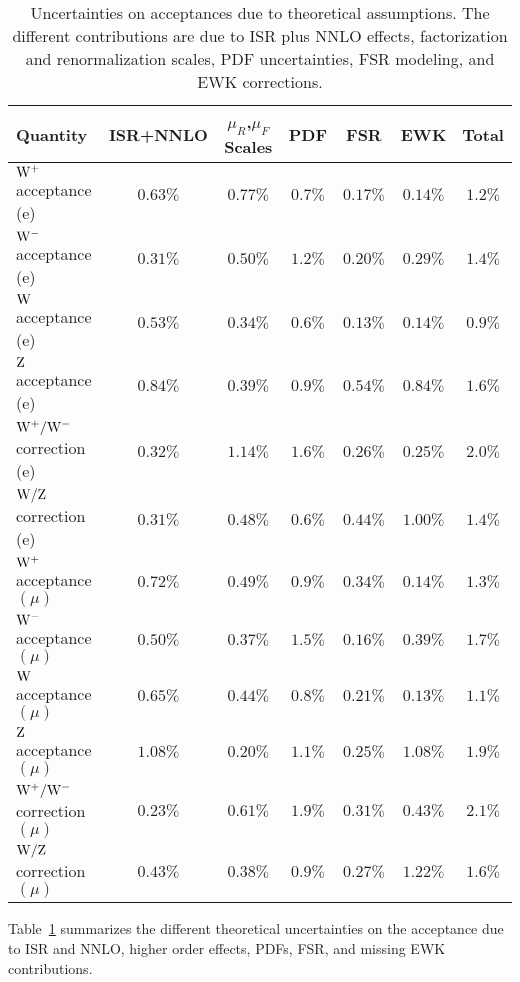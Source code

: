 \begin{table}[!ht] %
\begin{center}
\caption{Uncertainties on acceptances due to theoretical assumptions. The different contributions are due to
ISR plus NNLO effects, factorization and renormalization scales, PDF uncertainties, FSR modeling, and EWK corrections.}
\label{tab:th_results}
\begin{tabular}{|l|ccccc|c|}
	\hline
	Quantity & ISR+NNLO & $\mu_R$,$\mu_F$ Scales & PDF & FSR & EWK & Total \\
	\hline\hline
	$\mathrm{W^+}$ acceptance (e)     & $0.63\%$ & $0.77\%$ & $0.7\%$ & $0.17\%$ & $0.14\%$ & $1.2\%$ \\
	$\mathrm{W^-}$ acceptance (e)     & $0.31\%$ & $0.50\%$ & $1.2\%$ & $0.20\%$ & $0.29\%$ & $1.4\%$ \\
	$\mathrm{W}$ acceptance (e)       & $0.53\%$ & $0.34\%$ & $0.6\%$ & $0.13\%$ & $0.14\%$ & $0.9\%$ \\
	$\mathrm{Z}$ acceptance (e)       & $0.84\%$ & $0.39\%$ & $0.9\%$ & $0.54\%$ & $0.84\%$ & $1.6\%$ \\
	$\mathrm{W^+}/\mathrm{W^-}$ correction (e) & $0.32\%$ & $1.14\%$ & $1.6\%$ & $0.26\%$ & $0.25\%$ & $2.0\%$ \\
	$\mathrm{W}/\mathrm{Z}$ correction (e)     & $0.31\%$ & $0.48\%$ & $0.6\%$ & $0.44\%$ & $1.00\%$ & $1.4\%$ \\
	\hline
	$\mathrm{W^+}$ acceptance $(\mu)$     & $0.72\%$ & $0.49\%$ & $0.9\%$ & $0.34\%$ & $0.14\%$ & $1.3\%$ \\
	$\mathrm{W^-}$ acceptance $(\mu)$     & $0.50\%$ & $0.37\%$ & $1.5\%$ & $0.16\%$ & $0.39\%$ & $1.7\%$ \\
	$\mathrm{W}$ acceptance $(\mu)$       & $0.65\%$ & $0.44\%$ & $0.8\%$ & $0.21\%$ & $0.13\%$ & $1.1\%$ \\
	$\mathrm{Z}$ acceptance $(\mu)$       & $1.08\%$ & $0.20\%$ & $1.1\%$ & $0.25\%$ & $1.08\%$ & $1.9\%$ \\
	$\mathrm{W^+}/\mathrm{W^-}$ correction $(\mu)$ & $0.23\%$ & $0.61\%$ & $1.9\%$ & $0.31\%$ & $0.43\%$ & $2.1\%$ \\
	$\mathrm{W}/\mathrm{Z}$ correction $(\mu)$     & $0.43\%$ & $0.38\%$ & $0.9\%$ & $0.27\%$ & $1.22\%$ & $1.6\%$ \\
	\hline
\end{tabular}
\end{center}
\end{table}


Table~\ref{tab:th_results} summarizes the different theoretical uncertainties on the acceptance
due to ISR and NNLO, higher order effects, PDFs, FSR, and missing
EWK contributions.

